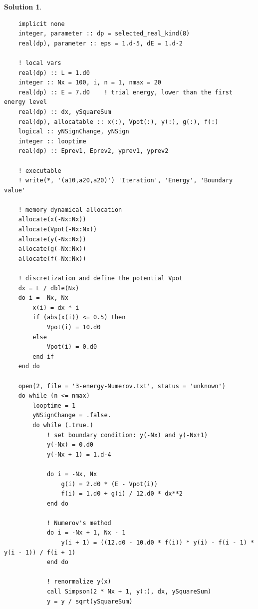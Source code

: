\documentclass[UTF8,10pt,a4paper]{article}
\theoremstyle{Problem}
\theoremstyle{Solution}
\newtheorem*{sol}{Solution}
\begin{document}
\begin{sol}
\begin{lstlisting}
    implicit none
    integer, parameter :: dp = selected_real_kind(8)
    real(dp), parameter :: eps = 1.d-5, dE = 1.d-2

    ! local vars
    real(dp) :: L = 1.d0
    integer :: Nx = 100, i, n = 1, nmax = 20
    real(dp) :: E = 7.d0    ! trial energy, lower than the first energy level
    real(dp) :: dx, ySquareSum
    real(dp), allocatable :: x(:), Vpot(:), y(:), g(:), f(:)
    logical :: yNSignChange, yNSign
    integer :: looptime
    real(dp) :: Eprev1, Eprev2, yprev1, yprev2

    ! executable
    ! write(*, '(a10,a20,a20)') 'Iteration', 'Energy', 'Boundary value'

    ! memory dynamical allocation
    allocate(x(-Nx:Nx))
    allocate(Vpot(-Nx:Nx))
    allocate(y(-Nx:Nx))
    allocate(g(-Nx:Nx))
    allocate(f(-Nx:Nx))

    ! discretization and define the potential Vpot
    dx = L / dble(Nx)
    do i = -Nx, Nx
        x(i) = dx * i
        if (abs(x(i)) <= 0.5) then
            Vpot(i) = 10.d0
        else
            Vpot(i) = 0.d0
        end if
    end do

    open(2, file = '3-energy-Numerov.txt', status = 'unknown')
    do while (n <= nmax)
        looptime = 1
        yNSignChange = .false.
        do while (.true.)
            ! set boundary condition: y(-Nx) and y(-Nx+1)
            y(-Nx) = 0.d0
            y(-Nx + 1) = 1.d-4

            do i = -Nx, Nx
                g(i) = 2.d0 * (E - Vpot(i))
                f(i) = 1.d0 + g(i) / 12.d0 * dx**2
            end do

            ! Numerov's method
            do i = -Nx + 1, Nx - 1
                y(i + 1) = ((12.d0 - 10.d0 * f(i)) * y(i) - f(i - 1) * y(i - 1)) / f(i + 1)
            end do

            ! renormalize y(x)
            call Simpson(2 * Nx + 1, y(:), dx, ySquareSum)
            y = y / sqrt(ySquareSum)


\end{lstlisting}
\end{sol}
\end{document}
